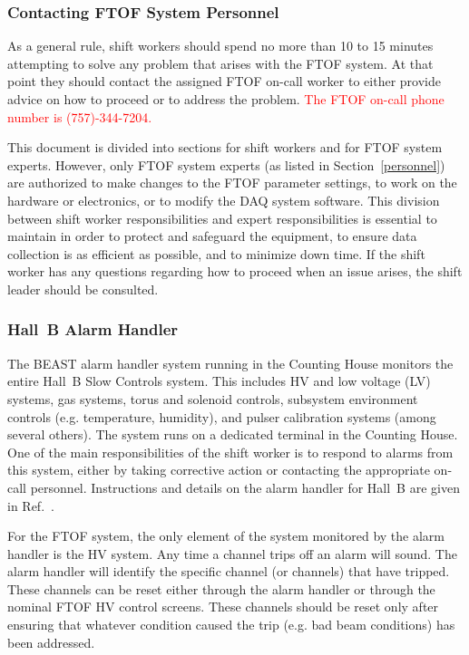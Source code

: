 \documentclass[12pt]{article}
\begin{document}
\subsubsection{Contacting FTOF System Personnel}
\label{contact}

As a general rule, shift workers should spend no more than 10 to 15 minutes attempting to solve
any problem that arises with the FTOF system. At that point they should contact the assigned 
FTOF on-call worker to either provide advice on how to proceed or to address the problem.
\textcolor{red}{The FTOF on-call phone number is (757)-344-7204.}

This document is divided into sections for shift workers and for FTOF system experts. However, 
only FTOF system experts (as listed in Section~\ref{personnel}) are authorized to make changes to 
the FTOF parameter settings, to work on the hardware or electronics, or to modify the DAQ system 
software. This division between shift worker responsibilities and expert responsibilities is
essential to maintain in order to protect and safeguard the equipment, to ensure data collection
is as efficient as possible, and to minimize down time. If the shift worker has any questions 
regarding how to proceed when an issue arises, the shift leader should be consulted.

\subsubsection{Hall~B Alarm Handler}
\label{alarms}

The BEAST alarm handler system running in the Counting House monitors the entire Hall~B Slow 
Controls system. This includes HV and low voltage (LV) systems, gas systems, torus and solenoid 
controls, subsystem environment controls (e.g. temperature, humidity), and pulser calibration 
systems (among several others). The system runs on a dedicated terminal in the Counting House. 
One of the main responsibilities of the shift worker is to respond to alarms from this system, 
either by taking corrective action or contacting the appropriate on-call personnel. Instructions 
and details on the alarm handler for Hall~B are given in Ref.~\cite{beast}.

For the FTOF system, the only element of the system monitored by the alarm handler is the HV system.
Any time a channel trips off an alarm will sound. The alarm handler will identify the specific
channel (or channels) that have tripped. These channels can be reset either through the alarm handler
or through the nominal FTOF HV control screens. These channels should be reset only after ensuring
that whatever condition caused the trip (e.g. bad beam conditions) has been addressed.
\end{document}
